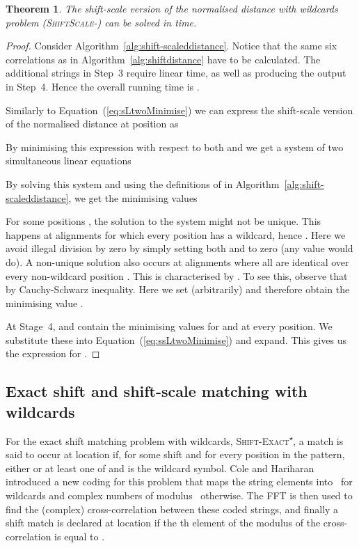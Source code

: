 \documentclass[11pt]{article}
\newcommand{\wildcard}{\ensuremath{\star}\xspace}
\newcommand{\sExactWild}{\textsc{Shift-Exact\textsuperscript{\wildcard}}\xspace}
\newcommand{\ssLtwoWild}{\textsc{ShiftScale-}\xspace}
\theoremstyle{plain}
\newtheorem{theorem}{Theorem}[]
\theoremstyle{definition}
\begin{document}
\begin{theorem}
    \label{thm:ssLtwoWild}
    The shift-scale version of the normalised  distance with wildcards problem (\ssLtwoWild) can be solved in  time.
\end{theorem}
\begin{proof}
    Consider Algorithm~\ref{alg:shift-scaleddistance}. Notice that the same six correlations as in Algorithm~\ref{alg:shiftdistance} have to be calculated. The additional strings in Step~3 require linear time, as well as producing the output in Step~4. Hence the overall running time is .

    Similarly to Equation~(\ref{eq:sLtwoMinimise}) we can express the shift-scale version of the normalised  distance at position  as

By minimising this expression with respect to both  and  we get a system of two simultaneous linear equations

By solving this system and using the definitions of  in Algorithm~\ref{alg:shift-scaleddistance}, we get the minimising values

For some positions , the solution to the system might not be unique. This happens at alignments  for which every position  has a wildcard, hence . Here we avoid illegal division by zero by simply setting both  and  to zero (any value would do). A non-unique solution also occurs at alignments  where all  are identical over every non-wildcard position . This is characterised by . To see this, observe that  by Cauchy-Schwarz inequality. Here we set (arbitrarily)  and therefore obtain the minimising value .

    At Stage~4,  and  contain the minimising values for  and  at every position. We substitute these into Equation~(\ref{eq:ssLtwoMinimise}) and expand. This gives us the expression for .
\end{proof}


\subsection{Exact shift and shift-scale matching with wildcards}

For the exact shift matching problem with wildcards, \sExactWild, a match is said to occur at location  if, for some shift  and  for every position  in the pattern, either  or at least one of  and  is the wildcard symbol. Cole and Hariharan~\cite{CH:2002} introduced a new coding for this problem that maps the string elements into~ for wildcards and complex numbers of modulus~ otherwise.  The FFT is then used to find the (complex) cross-correlation between these coded strings, and finally a shift match is declared at location  if the th element of the modulus of the cross-correlation is equal to .
\end{document}
